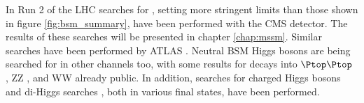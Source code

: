In Run 2 of the \acs{LHC} searches for \AHtotautau, setting more stringent limits than those shown in figure \ref{fig:bsm_summary},
have been performed with the \acs{CMS} detector. The results of these searches will be presented in chapter \ref{chap:mssm}. 
Similar searches have been performed by ATLAS \cite{ATLASMSSMtautau2016}. Neutral BSM Higgs bosons
are being searched for in other channels too, with some results for decays into $\Ptop\Ptop$ \cite{ATLASHttbar}, 
ZZ \cite{CMSHZZ2016,ATLASHZZ2016}, and WW \cite{ATLASHeavyHWW} already public.
In addition, searches for charged
Higgs bosons \cite{ATLASHplustaunu,ATLASHplustb,CMSHplustaunu} and
di-Higgs searches \cite{ATLASHbbgamgam,ATLASHgamgamWW,ATLASHhhbbbb,CMSbbgamgam,CMSHbbtautau,CMSHbbWW}, both in 
various final states, have been performed. %

